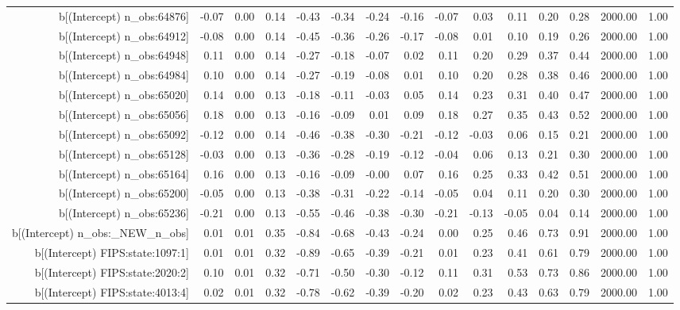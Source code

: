 \begin{table}[ht]
\begin{tabular}{rrrrrrrrrrrrrrr}
  b[(Intercept) n\_obs:64876] & -0.07 & 0.00 & 0.14 & -0.43 & -0.34 & -0.24 & -0.16 & -0.07 & 0.03 & 0.11 & 0.20 & 0.28 & 2000.00 & 1.00 \\ 
  b[(Intercept) n\_obs:64912] & -0.08 & 0.00 & 0.14 & -0.45 & -0.36 & -0.26 & -0.17 & -0.08 & 0.01 & 0.10 & 0.19 & 0.26 & 2000.00 & 1.00 \\ 
  b[(Intercept) n\_obs:64948] & 0.11 & 0.00 & 0.14 & -0.27 & -0.18 & -0.07 & 0.02 & 0.11 & 0.20 & 0.29 & 0.37 & 0.44 & 2000.00 & 1.00 \\ 
  b[(Intercept) n\_obs:64984] & 0.10 & 0.00 & 0.14 & -0.27 & -0.19 & -0.08 & 0.01 & 0.10 & 0.20 & 0.28 & 0.38 & 0.46 & 2000.00 & 1.00 \\ 
  b[(Intercept) n\_obs:65020] & 0.14 & 0.00 & 0.13 & -0.18 & -0.11 & -0.03 & 0.05 & 0.14 & 0.23 & 0.31 & 0.40 & 0.47 & 2000.00 & 1.00 \\ 
  b[(Intercept) n\_obs:65056] & 0.18 & 0.00 & 0.13 & -0.16 & -0.09 & 0.01 & 0.09 & 0.18 & 0.27 & 0.35 & 0.43 & 0.52 & 2000.00 & 1.00 \\ 
  b[(Intercept) n\_obs:65092] & -0.12 & 0.00 & 0.14 & -0.46 & -0.38 & -0.30 & -0.21 & -0.12 & -0.03 & 0.06 & 0.15 & 0.21 & 2000.00 & 1.00 \\ 
  b[(Intercept) n\_obs:65128] & -0.03 & 0.00 & 0.13 & -0.36 & -0.28 & -0.19 & -0.12 & -0.04 & 0.06 & 0.13 & 0.21 & 0.30 & 2000.00 & 1.00 \\ 
  b[(Intercept) n\_obs:65164] & 0.16 & 0.00 & 0.13 & -0.16 & -0.09 & -0.00 & 0.07 & 0.16 & 0.25 & 0.33 & 0.42 & 0.51 & 2000.00 & 1.00 \\ 
  b[(Intercept) n\_obs:65200] & -0.05 & 0.00 & 0.13 & -0.38 & -0.31 & -0.22 & -0.14 & -0.05 & 0.04 & 0.11 & 0.20 & 0.30 & 2000.00 & 1.00 \\ 
  b[(Intercept) n\_obs:65236] & -0.21 & 0.00 & 0.13 & -0.55 & -0.46 & -0.38 & -0.30 & -0.21 & -0.13 & -0.05 & 0.04 & 0.14 & 2000.00 & 1.00 \\ 
  b[(Intercept) n\_obs:\_NEW\_n\_obs] & 0.01 & 0.01 & 0.35 & -0.84 & -0.68 & -0.43 & -0.24 & 0.00 & 0.25 & 0.46 & 0.73 & 0.91 & 2000.00 & 1.00 \\ 
  b[(Intercept) FIPS:state:1097:1] & 0.01 & 0.01 & 0.32 & -0.89 & -0.65 & -0.39 & -0.21 & 0.01 & 0.23 & 0.41 & 0.61 & 0.79 & 2000.00 & 1.00 \\ 
  b[(Intercept) FIPS:state:2020:2] & 0.10 & 0.01 & 0.32 & -0.71 & -0.50 & -0.30 & -0.12 & 0.11 & 0.31 & 0.53 & 0.73 & 0.86 & 2000.00 & 1.00 \\ 
  b[(Intercept) FIPS:state:4013:4] & 0.02 & 0.01 & 0.32 & -0.78 & -0.62 & -0.39 & -0.20 & 0.02 & 0.23 & 0.43 & 0.63 & 0.79 & 2000.00 & 1.00 \\ 

\end{tabular}
\end{table}
